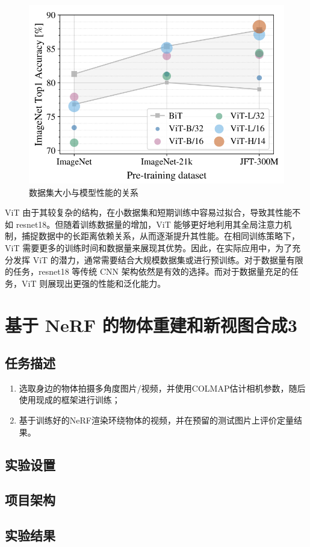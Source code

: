\documentclass[notitlepage,cs4size,punct,oneside]{ctexrep}
\numberwithin{equation}{chapter}
\theoremstyle{mystyle}
\begin{document}
\begin{figure}[H]
    \centering
    \includegraphics[scale=0.75]{ViT_vs_CNN.png}
    \caption{数据集大小与模型性能的关系}
\end{figure}

ViT 由于其较复杂的结构，在小数据集和短期训练中容易过拟合，导致其性能不如 resnet18。但随着训练数据量的增加，ViT 能够更好地利用其全局注意力机制，捕捉数据中的长距离依赖关系，从而逐渐提升其性能。在相同训练策略下，ViT 需要更多的训练时间和数据量来展现其优势。因此，在实际应用中，为了充分发挥 ViT 的潜力，通常需要结合大规模数据集或进行预训练。对于数据量有限的任务，resnet18 等传统 CNN 架构依然是有效的选择。而对于数据量充足的任务，ViT 则展现出更强的性能和泛化能力。

\chapter{基于 NeRF 的物体重建和新视图合成3}
\section{任务描述}
\begin{enumerate}
\item 选取身边的物体拍摄多角度图片/视频，并使用COLMAP估计相机参数，随后使用现成的框架进行训练；
\item 基于训练好的NeRF渲染环绕物体的视频，并在预留的测试图片上评价定量结果。
\end{enumerate}

\section{实验设置}

\section{项目架构}

\section{实验结果}
\end{document}
